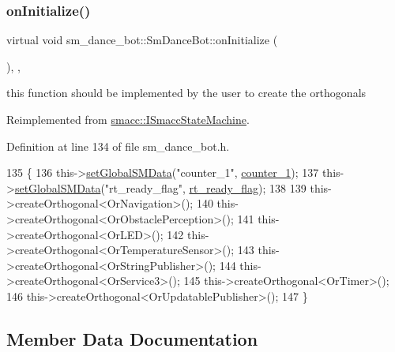 \subsubsection{\texorpdfstring{on\+Initialize()}{onInitialize()}}
{\footnotesize\ttfamily virtual void sm\+\_\+dance\+\_\+bot\+::\+Sm\+Dance\+Bot\+::on\+Initialize (\begin{DoxyParamCaption}{ }\end{DoxyParamCaption})\hspace{0.3cm}{\ttfamily [inline]}, {\ttfamily [override]}, {\ttfamily [virtual]}}



this function should be implemented by the user to create the orthogonals 



Reimplemented from \hyperlink{classsmacc_1_1ISmaccStateMachine_ac2982c6c8283663e5e1e8a7c82f511ec}{smacc\+::\+I\+Smacc\+State\+Machine}.



Definition at line 134 of file sm\+\_\+dance\+\_\+bot.\+h.


\begin{DoxyCode}
135     \{
136         this->\hyperlink{classsmacc_1_1ISmaccStateMachine_a8588f9e580fbb95b53e2bd2ca3ff1f98}{setGlobalSMData}(\textcolor{stringliteral}{"counter\_1"}, \hyperlink{structsm__dance__bot_1_1SmDanceBot_ab3b8db557ce94d34c60b291911eb140c}{counter\_1});
137         this->\hyperlink{classsmacc_1_1ISmaccStateMachine_a8588f9e580fbb95b53e2bd2ca3ff1f98}{setGlobalSMData}(\textcolor{stringliteral}{"rt\_ready\_flag"}, \hyperlink{structsm__dance__bot_1_1SmDanceBot_a0f0587a13670ad8925555cd8f6cb6b2d}{rt\_ready\_flag});
138 
139         this->createOrthogonal<OrNavigation>();
140         this->createOrthogonal<OrObstaclePerception>();
141         this->createOrthogonal<OrLED>();
142         this->createOrthogonal<OrTemperatureSensor>();
143         this->createOrthogonal<OrStringPublisher>();
144         this->createOrthogonal<OrService3>();
145         this->createOrthogonal<OrTimer>();
146         this->createOrthogonal<OrUpdatablePublisher>();
147     \}
\end{DoxyCode}


\subsection{Member Data Documentation}
\mbox{\label{structsm__dance__bot_1_1SmDanceBot_ab3b8db557ce94d34c60b291911eb140c}} 
